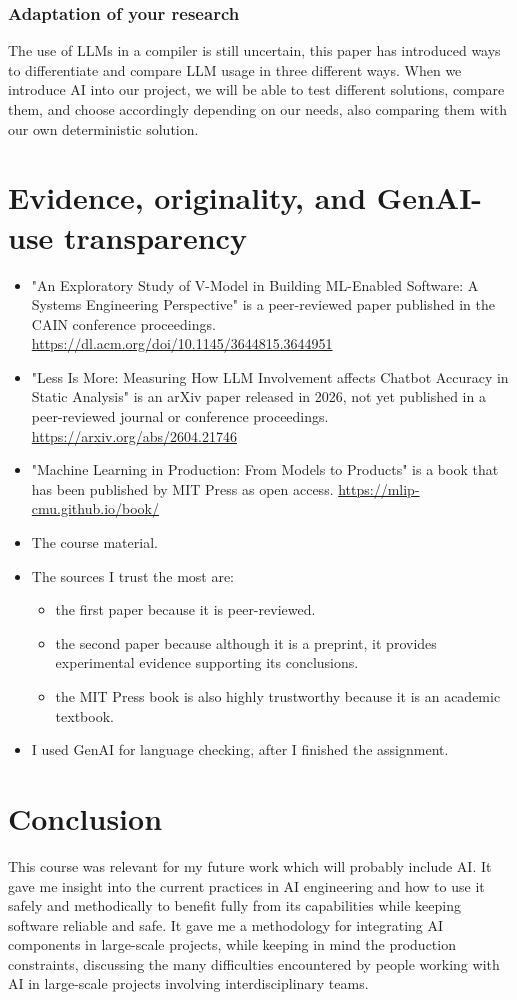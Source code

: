 \documentclass[11pt]{article}
\begin{document}
\subsubsection{Adaptation of your research}
\label{sec:org51ac938}
The use of LLMs in a compiler is still uncertain, this paper has introduced ways
to differentiate and compare LLM usage in three different ways. When we
introduce AI into our project, we will be able to test different solutions,
compare them, and choose accordingly depending on our needs, also comparing them
with our own deterministic solution.
\section{Evidence, originality, and GenAI-use transparency}
\label{sec:org67dce05}
\begin{itemize}
\item "An Exploratory Study of V-Model in Building ML-Enabled Software: A Systems
Engineering Perspective" is a peer-reviewed paper published in the CAIN
conference proceedings.  \url{https://dl.acm.org/doi/10.1145/3644815.3644951}
\item "Less Is More: Measuring How LLM Involvement affects Chatbot Accuracy in
Static Analysis" is an arXiv paper released in 2026, not yet published in a
peer-reviewed journal or conference proceedings.
\url{https://arxiv.org/abs/2604.21746}
\item "Machine Learning in Production: From Models to Products" is a book that has
been published by MIT Press as open access.  \url{https://mlip-cmu.github.io/book/}
\item The course material.
\item The sources I trust the most are:
\begin{itemize}
\item the first paper because it is peer-reviewed.
\item the second paper because although it is a preprint, it provides experimental
evidence supporting its conclusions.
\item the MIT Press book is also highly trustworthy because it is an academic
textbook.
\end{itemize}
\item I used GenAI for language checking, after I finished the assignment.
\end{itemize}
\section{Conclusion}
\label{sec:orga02dc54}
This course was relevant for my future work which will probably include AI. It
gave me insight into the current practices in AI engineering and how to use it
safely and methodically to benefit fully from its capabilities while keeping
software reliable and safe. It gave me a methodology for integrating AI
components in large-scale projects, while keeping in mind the production
constraints, discussing the many difficulties encountered by people working with
AI in large-scale projects involving interdisciplinary teams.
\end{document}
